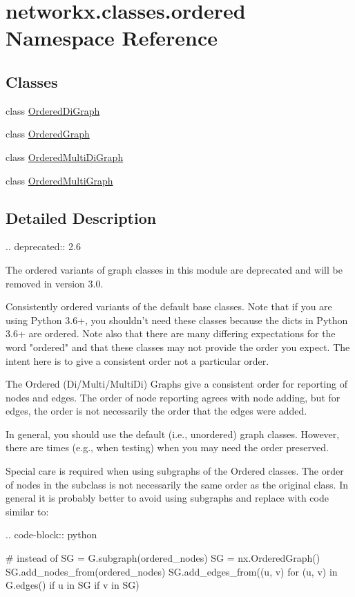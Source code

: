 \hypertarget{namespacenetworkx_1_1classes_1_1ordered}{}\section{networkx.\+classes.\+ordered Namespace Reference}
\label{namespacenetworkx_1_1classes_1_1ordered}
\subsection*{Classes}
\begin{DoxyCompactItemize}
\item 
class \hyperlink{classnetworkx_1_1classes_1_1ordered_1_1OrderedDiGraph}{Ordered\+Di\+Graph}
\item 
class \hyperlink{classnetworkx_1_1classes_1_1ordered_1_1OrderedGraph}{Ordered\+Graph}
\item 
class \hyperlink{classnetworkx_1_1classes_1_1ordered_1_1OrderedMultiDiGraph}{Ordered\+Multi\+Di\+Graph}
\item 
class \hyperlink{classnetworkx_1_1classes_1_1ordered_1_1OrderedMultiGraph}{Ordered\+Multi\+Graph}
\end{DoxyCompactItemize}


\subsection{Detailed Description}
\begin{DoxyVerb}.. deprecated:: 2.6

   The ordered variants of graph classes in this module are deprecated and
   will be removed in version 3.0.

Consistently ordered variants of the default base classes.
Note that if you are using Python 3.6+, you shouldn't need these classes
because the dicts in Python 3.6+ are ordered.
Note also that there are many differing expectations for the word "ordered"
and that these classes may not provide the order you expect.
The intent here is to give a consistent order not a particular order.

The Ordered (Di/Multi/MultiDi) Graphs give a consistent order for reporting of
nodes and edges.  The order of node reporting agrees with node adding, but for
edges, the order is not necessarily the order that the edges were added.

In general, you should use the default (i.e., unordered) graph classes.
However, there are times (e.g., when testing) when you may need the
order preserved.

Special care is required when using subgraphs of the Ordered classes.
The order of nodes in the subclass is not necessarily the same order
as the original class.  In general it is probably better to avoid using
subgraphs and replace with code similar to:

.. code-block:: python

    # instead of SG = G.subgraph(ordered_nodes)
    SG = nx.OrderedGraph()
    SG.add_nodes_from(ordered_nodes)
    SG.add_edges_from((u, v) for (u, v) in G.edges() if u in SG if v in SG)\end{DoxyVerb}
 